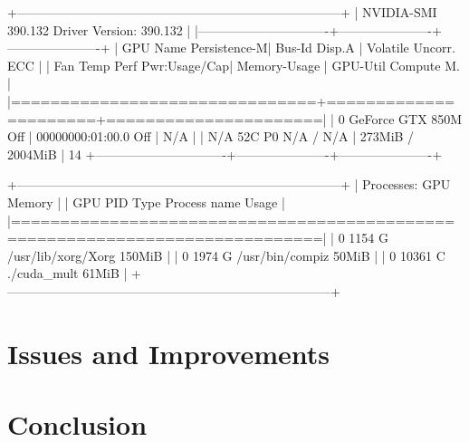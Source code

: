 \documentclass[12pt,a4paper]{article}
\begin{document}
+-----------------------------------------------------------------------------+
| NVIDIA-SMI 390.132                Driver Version: 390.132                   |
|-------------------------------+----------------------+----------------------+
| GPU  Name        Persistence-M| Bus-Id        Disp.A | Volatile Uncorr. ECC |
| Fan  Temp  Perf  Pwr:Usage/Cap|         Memory-Usage | GPU-Util  Compute M. |
|===============================+======================+======================|
|   0  GeForce GTX 850M    Off  | 00000000:01:00.0 Off |                  N/A |
| N/A   52C    P0    N/A /  N/A |    273MiB /  2004MiB |     14%
+-------------------------------+----------------------+----------------------+
                                                                               
+-----------------------------------------------------------------------------+
| Processes:                                                       GPU Memory |
|  GPU       PID   Type   Process name                             Usage      |
|=============================================================================|
|    0      1154      G   /usr/lib/xorg/Xorg                           150MiB |
|    0      1974      G   /usr/bin/compiz                               50MiB |
|    0     10361      C   ./cuda_mult                                   61MiB |
+-----------------------------------------------------------------------------+





\section{Issues and Improvements}

\section{Conclusion}


\end{document}
